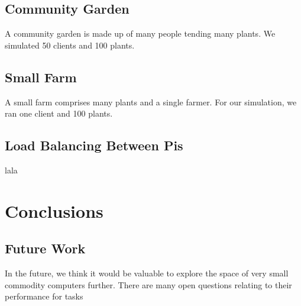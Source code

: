 \documentclass[a4paper]{acm_proc_article-sp}
\begin{document}
\subsection{Community Garden}

A community garden is made up of many people tending many plants.  We simulated 50 clients and 100 plants.

\subsection{Small Farm}

A small farm comprises many plants and a single farmer.  For our simulation, we ran one client and 100 plants.

\subsection{Load Balancing Between Pis}

lala

\section{Conclusions}

\subsection{Future Work}

In the future, we think it would be valuable to explore the space of very small commodity computers further.  There are many open questions relating to their performance for tasks



\end{document}
